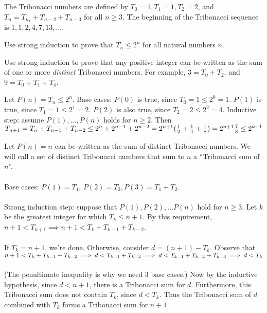 \documentclass[solution, letterpaper]{cs20}
\begin{document}

The Tribonacci numbers are defined by $T_0 = 1, T_1 = 1, T_2 = 2$, and $T_n = T_{n_1} + T_{n-2} + T_{n-3}$ for all $n \ge 3$. The beginning of the Tribonacci sequence is $1, 1, 2, 4, 7, 13, ...$. 

\subproblem Use strong induction to prove that $T_n \le 2^n$ for all natural numbers $n$.

\subproblem Use strong induction to prove that any positive integer can be written as the sum of one or more \textit{distinct} Tribonacci numbers. For example, $3 = T_0 + T_2$, and $9 = T_0 + T_1 + T_4$.

\begin{solution}
\subsolution 
Let $P(n) = T_n \le 2^n$. Base cases: $P(0)$ is true, since $T_0 = 1 \le 2^0 = 1$. $P(1)$ is true, since $T_1 = 1 \le 2^1 = 2$. $P(2)$ is also true, since $T_2 = 2 \le 2^2 = 4$. Inductive step: assume $P(1), ..., P(n)$ holds for $n \ge 2$. Then 
\begin{math}
T_{n+1} = T_n + T_{n-1} + T_{n-2}
\\ \le 2^n + 2^{n-1} + 2^{n-2}
\\ = 2^{n+1}(\frac{1}{2} + \frac{1}{4} + \frac{1}{8})
\\ = 2^{n+1}\frac{7}{8}
\\ \le 2^{k+1}
\end{math}

\subsolution
Let $P(n) = n$ can be written as the sum of distinct Tribonacci numbers. We will call a set of distinct Tribonacci numbers that sum to $n$ a ``Tribonacci sum of $n$''. 
\\\\
Base cases: $P(1) = T_1$, $P(2) = T_2, P(3) = T_1 + T_2$. 
\\\\
Strong induction step: suppose that $P(1), P(2), ... P(n)$ hold for $n \ge 3$. Let $k$ be the greatest integer for which $T_k \le n+1$. By this requirement, $n+1 < T_{k+1} \implies n+1 < T_k + T_{k-1} + T_{k-2}$. 
\\\\If $T_k = n+1$, we're done. Otherwise, consider $d = (n+1)-T_k$. Observe that 
\begin{math}
n+1 < T_k + T_{k-1} + T_{k-2} 
\\ \implies d < T_{k-1} + T_{k-2}
\\ \implies d < T_{k-1} + T_{k-2} + T_{k-3} 
\\ \implies d < T_k
\end{math}
\\\\(The penultimate inequality is why we need 3 base cases.)  Now by the inductive hypothesis, since $d < n+1$, there is a Tribonacci sum for $d$. Furthermore, this Tribonacci sum does not contain $T_k$, since $d < T_k$. Thus the Tribonacci sum of $d$ combined with $T_k$ forms a Tribonacci sum for $n+1$.
\end{solution}
\end{document}
